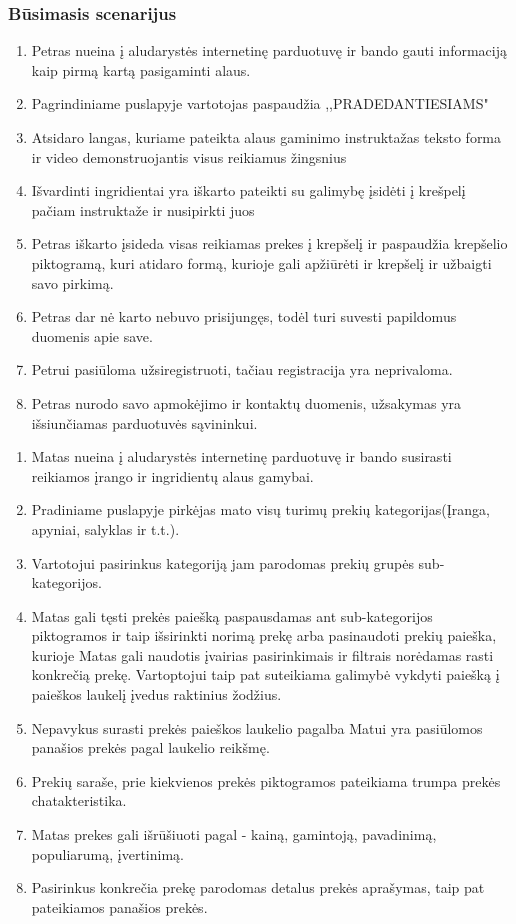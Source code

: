 \documentclass[oneside]{VUMIFPSkursinis}
\begin{document}
		\subsubsection{Būsimasis scenarijus}
				\begin{enumerate}
					\item{Petras nueina į aludarystės internetinę parduotuvę ir bando gauti informaciją kaip pirmą kartą pasigaminti alaus.}
					\item{Pagrindiniame puslapyje vartotojas paspaudžia ,,PRADEDANTIESIAMS"}
					\item{Atsidaro langas, kuriame pateikta alaus gaminimo instruktažas teksto forma ir video demonstruojantis visus reikiamus žingsnius}
					\item{Išvardinti ingridientai yra iškarto pateikti su galimybę įsidėti į krešpelį pačiam instruktaže ir nusipirkti juos}
					\item{Petras iškarto įsideda visas reikiamas prekes į krepšelį ir paspaudžia krepšelio piktogramą, kuri atidaro formą, kurioje gali apžiūrėti ir krepšelį ir užbaigti savo pirkimą.}
					\item{Petras dar nė karto nebuvo prisijungęs, todėl turi suvesti papildomus duomenis apie save.}
					\item{Petrui pasiūloma užsiregistruoti, tačiau registracija yra neprivaloma.}
					\item{Petras nurodo savo apmokėjimo ir kontaktų duomenis, užsakymas yra išsiunčiamas parduotuvės sąvininkui.}
				\end{enumerate}
				\begin{enumerate}
					\item{Matas nueina į aludarystės internetinę parduotuvę ir bando susirasti reikiamos įrango ir ingridientų alaus gamybai.}
					\item{Pradiniame puslapyje pirkėjas mato visų turimų prekių kategorijas(Įranga, apyniai, salyklas ir t.t.).}
					\item{Vartotojui pasirinkus kategoriją jam parodomas prekių grupės sub-kategorijos.}
					\item{Matas gali tęsti prekės paiešką paspausdamas ant sub-kategorijos piktogramos ir taip išsirinkti norimą prekę arba pasinaudoti prekių paieška, kurioje Matas gali naudotis įvairias  pasirinkimais ir filtrais norėdamas rasti konkrečią prekę. Vartoptojui taip pat suteikiama galimybė vykdyti paiešką į paieškos laukelį įvedus raktinius žodžius.}
					\item{Nepavykus surasti prekės paieškos laukelio pagalba Matui yra pasiūlomos panašios prekės pagal laukelio reikšmę.}
					\item{Prekių saraše, prie kiekvienos prekės piktogramos pateikiama trumpa prekės chatakteristika. }
					\item{Matas prekes gali išrūšiuoti pagal - kainą, gamintoją, pavadinimą, populiarumą, įvertinimą.}
					\item{Pasirinkus konkrečia prekę parodomas detalus prekės aprašymas, taip pat pateikiamos panašios prekės.}
				\end{enumerate}
\end{document}

